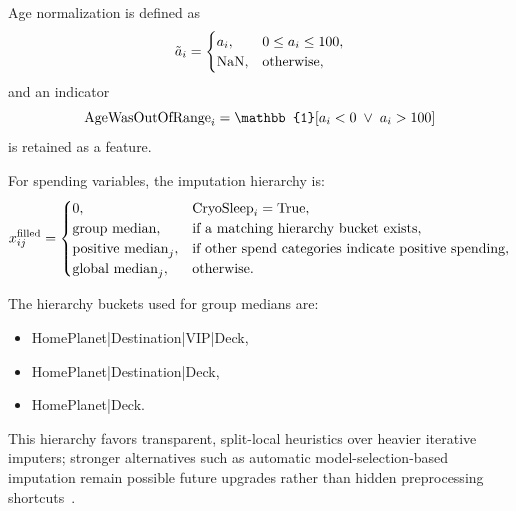\documentclass[conference]{IEEEtran}
\renewcommand{\texttt}[1]{\textnormal{#1}}
\begin{document}
Age normalization is defined as
\begin{equation}
\tilde{a}_i =
\begin{cases}
a_i, & 0 \le a_i \le 100,\\
\texttt{NaN}, & \text{otherwise},
\end{cases}
\end{equation}
and an indicator
\begin{equation}
\texttt{AgeWasOutOfRange}_i = \mathbb{1}[a_i < 0 \; \lor \; a_i > 100]
\end{equation}
is retained as a feature.

For spending variables, the imputation hierarchy is:
\begin{equation}
x_{ij}^{\text{filled}} =
\begin{cases}
0, & \texttt{CryoSleep}_i=\texttt{True},\\
\text{group median}, & \text{if a matching hierarchy bucket exists},\\
\text{positive median}_j, & \text{if other spend categories indicate positive spending},\\
\text{global median}_j, & \text{otherwise}.
\end{cases}
\end{equation}

The hierarchy buckets used for group medians are:
\begin{itemize}
\item \texttt{HomePlanet|Destination|VIP|Deck},
\item \texttt{HomePlanet|Destination|Deck},
\item \texttt{HomePlanet|Deck}.
\end{itemize}
This hierarchy favors transparent, split-local heuristics over heavier iterative imputers; stronger alternatives such as automatic model-selection-based imputation remain possible future upgrades rather than hidden preprocessing shortcuts~\cite{jarrett2022hyperimpute,josse2024missingconsistency,zhou2024missingreview}.
\end{document}
